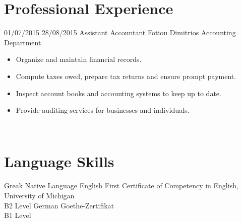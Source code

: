 \documentclass[letterpaper]{engineer_cv} %
\begin{document}

	\section{Professional Experience}

	\begin{longList} %
		\longListItem
			{01/07/2015}
			{28/08/2015}
			{Assistant Accountant}
			{Fotiou Dimitrios Accounting Department}
			{}
			{\begin{itemize}
				\item Organize and maintain financial records.
				\item Compute taxes owed, prepare tax returns and ensure prompt payment.
                \item Inspect account books and accounting systems to keep up to date.
                \item Provide auditing services for businesses and individuals.
			\end{itemize}}
			\\
        \end{longList}


	\section{Language Skills}

	\begin{longList} %
		\longListItem
			{Greak}
			{}
			{Native Language}
			{}
			{}
			{}
		\longListItem
			{English}
			{}
			{First Certificate of Competency in English, University of Michigan}
			{\\B2 Level}
			{}
			{}
		\longListItem
			{German}
			{}
			{Goethe-Zertifikat}
			{\\B1 Level}
			{}
			{}
	\end{longList}


        \clearpage

	\infographics
\end{document}
